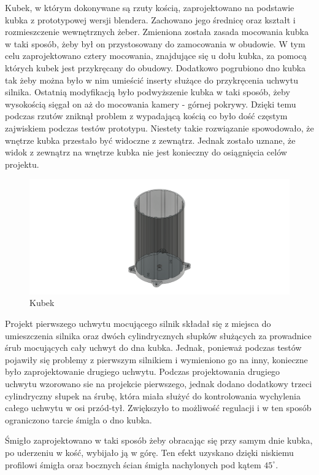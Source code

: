 Kubek, w którym dokonywane są rzuty kością, zaprojektowano na podstawie kubka z prototypowej wersji blendera. Zachowano jego średnicę oraz kształt i rozmieszczenie wewnętrznych
żeber. Zmieniona została zasada mocowania kubka w taki sposób, żeby był on przystosowany do zamocowania w obudowie. W tym celu zaprojektowano
cztery mocowania, znajdujące się u dołu kubka, za pomocą których kubek jest przykręcany do obudowy. Dodatkowo pogrubiono dno kubka tak żeby można było w nim umieścić inserty służące 
do przykręcenia uchwytu silnika. Ostatnią modyfikacją było podwyższenie kubka w taki sposób, żeby wysokością sięgał on aż do mocowania kamery - górnej pokrywy.
Dzięki temu podczas rzutów zniknął problem z wypadającą kością co było dość częstym zajwiskiem podczas testów prototypu. Niestety takie rozwiązanie
spowodowało, że wnętrze kubka przestało być widoczne z zewnątrz. Jednak zostało uznane, że widok z zewnątrz na wnętrze kubka nie jest konieczny do osiągnięcia celów projektu.

\begin{figure}[H]
    \centering
    \includegraphics[width=0.95\linewidth]{chapters/03-praca-wlasna/figures/kubek.png}
    \caption{\label{fig:kubek}Kubek}
\end{figure}

Projekt pierwszego uchwytu mocującego silnik składał się z miejsca do umieszczenia silnika oraz dwóch cylindrycznych słupków służących za prowadnice
śrub mocujących cały uchwyt do dna kubka. Jednak, ponieważ podczas testów pojawiły się problemy z pierwszym silnikiem i wymieniono go na inny, konieczne
było zaprojektowanie drugiego uchwytu. Podczas projektowania drugiego uchwytu wzorowano sie na projekcie pierwszego, jednak dodano dodatkowy trzeci
cylindryczny słupek na śrubę, która miała służyć do kontrolowania wychylenia całego uchwytu w osi przód-tył. Zwiększyło to możliwość regulacji i w ten sposób
ograniczono tarcie śmigla o dno kubka. 

Śmigło zaprojektowano w taki sposób żeby obracając się przy samym dnie kubka, po uderzeniu w kość, wybijało ją w górę. Ten efekt uzyskano
dzięki niskiemu profilowi śmigła oraz bocznych ścian śmigła nachylonych pod kątem $45^{\circ}$.

